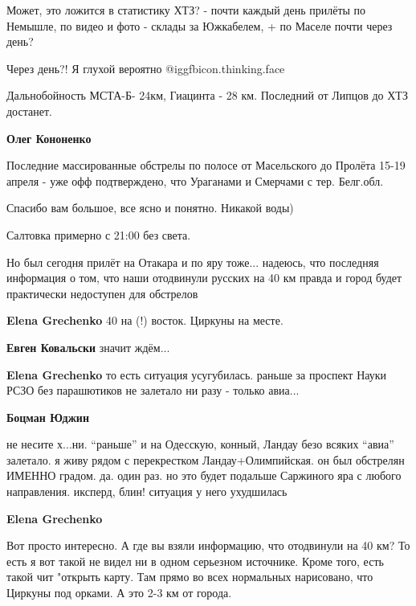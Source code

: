 \begin{itemize}
\begin{itemize}
Может, это ложится в статистику ХТЗ? - почти каждый день прилёты по Немышле, по
видео и фото - склады за Южкабелем, + по Маселе почти через день?

Через день?!
Я глухой вероятно @igg{fbicon.thinking.face} 
\end{itemize} %


Дальнобойность МСТА-Б- 24км, Гиацинта - 28 км. Последний от Липцов до ХТЗ
достанет.

\begin{itemize} %
\textbf{Олег Кононенко} 

Последние массированные обстрелы по полосе от Масельского до Пролёта 15-19
апреля - уже офф подтверждено, что Ураганами и Смерчами с тер. Белг.обл.

\end{itemize} %

Спасибо вам большое, все ясно и понятно. Никакой воды)

Салтовка примерно с 21:00 без света.


Но был сегодня прилёт на Отакара и по яру тоже... надеюсь, что последняя
информация о том, что наши отодвинули русских на 40 км правда и город будет
практически недоступен для обстрелов

\begin{itemize} %
\textbf{Elena Grechenko} 40 на (!) восток.
Циркуны на месте.

\textbf{Евген Ковальски} значит ждём...

\textbf{Elena Grechenko} то есть ситуация усугубилась. раньше за проспект Науки РСЗО без парашютиков не залетало ни разу - только авиа...

\textbf{Боцман Юджин} 

не несите х...ни. \enquote{раньше} и на Одесскую, конный, Ландау безо всяких \enquote{авиа}
залетало. я живу рядом с перекрестком Ландау+Олимпийская. он был обстрелян
ИМЕННО градом. да. один раз. но это будет подальше Саржиного яра с любого
направления. иксперд, блин! ситуация у него ухудшилась

\textbf{Elena Grechenko} 

Вот просто интересно. А где вы взяли информацию, что отодвинули на 40 км? То
есть я вот такой не видел ни в одном серьезном источнике. Кроме того, есть
такой чит "открыть карту. Там прямо во всех нормальных нарисовано, что Циркуны
под орками. А это 2-3 км от города.


\end{itemize}
\end{itemize}
